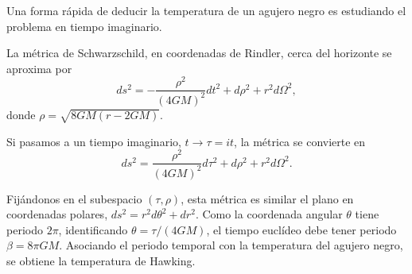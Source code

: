 Una forma rápida de deducir la temperatura de un agujero negro es estudiando el problema en
tiempo imaginario.

La métrica de Schwarzschild, en coordenadas de Rindler, cerca del horizonte se aproxima por 
\begin{equation}
  ds^2= -\frac{\rho^2}{(4GM)^2}dt^2 + d\rho^2 +r^2 d\Omega^2,
  \label{eq:ri}
\end{equation}
donde $\rho = \sqrt{8GM (r-2GM)}$.

Si pasamos a un tiempo imaginario, $t\to \tau=it$, la métrica se convierte en
\begin{equation}
  ds^2= \frac{\rho^2}{(4GM)^2}d\tau^2 + d\rho^2 +r^2 d\Omega^2.
\end{equation}

Fijándonos en el subespacio $(\tau,\rho)$, esta métrica es similar el plano en coordenadas polares, $ds^2=r^2d \theta^2 + dr^2$.
Como la coordenada angular $\theta$ tiene periodo $2\pi$, identificando $\theta=\tau/(4GM)$, el tiempo euclídeo debe tener periodo $\beta=8\pi G M$.
Asociando el periodo temporal con la temperatura del agujero negro, se obtiene la temperatura de Hawking.
